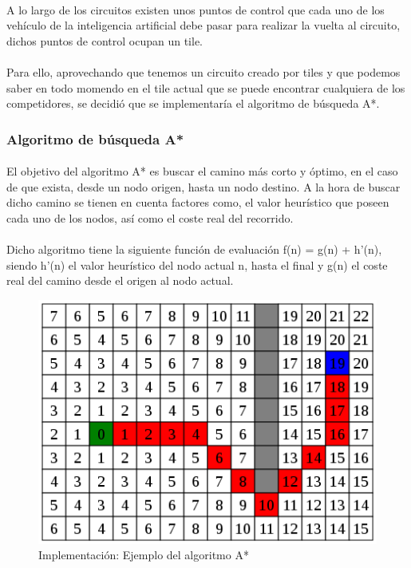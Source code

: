 \paragraph{}
A lo largo de los circuitos existen unos puntos de control que cada uno de los vehículo de la inteligencia artificial
debe pasar para realizar la vuelta al circuito, dichos puntos de control ocupan un tile.

\paragraph{}
Para ello, aprovechando que tenemos un circuito creado por tiles y que podemos saber en todo momendo en el tile actual
que se puede encontrar cualquiera de los competidores, se decidió que se implementaría el algoritmo de búsqueda A*.

\subsubsection{Algoritmo de búsqueda A*}

\paragraph{}
El objetivo del algoritmo A* es buscar el camino más corto y óptimo, en el caso de que exista, desde un nodo origen, hasta un
nodo destino. A la hora de buscar dicho camino se tienen en cuenta factores como, el valor heurístico que poseen cada uno
de los nodos, así como el coste real del recorrido.

\paragraph{}
Dicho algoritmo tiene la siguiente función de evaluación f(n) = g(n) + h'(n), siendo h'(n) el valor heurístico del nodo actual n,
hasta el final y g(n) el coste real del camino desde el origen al nodo actual.

\begin{figure}[H]
  \label{a_star}
  \begin{center}
    \includegraphics[scale=0.6]{imagenes/a_star.png}
  \end{center}
  \caption{Implementación: Ejemplo del algoritmo A*}
\end{figure}


